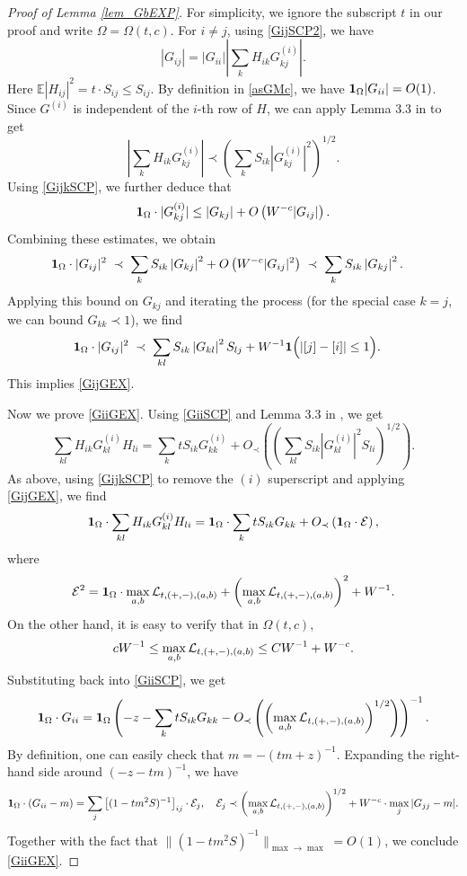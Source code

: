 \documentclass[10pt,reqno]{article}
\theoremstyle{plain} %
\theoremstyle{remark}
\numberwithin{equation}{section}
\begin{document}
\begin{proof}[Proof of Lemma \ref{lem_GbEXP}]
For simplicity, we ignore the subscript \( t \) in our proof and write \( \Omega = \Omega(t, c) \). For \( i \neq j \), using \eqref{GijSCP2}, we have
\[
|G_{ij}| = |G_{ii}| \left| \sum_{k} H_{ik} G^{(i)}_{kj} \right|.
\]
Here \( \mathbb{E} |H_{ij}|^2 = t \cdot S_{ij} \leq S_{ij} \). By definition in \eqref{asGMc}, we have $
{\bf 1}_{\Omega} |G_{ii}| = O(1)$. 
Since \( G^{(i)} \) is independent of the \( i \)-th row of \( H \), we can apply Lemma 3.3 in \cite{erdHos2012rigidity} to get
\[
\left| \sum_{k} H_{ik} G^{(i)}_{kj} \right| \prec 
\left( \sum_{k} S_{ik} \left| G^{(i)}_{kj} \right|^2 \right)^{1/2}.
\]
Using \eqref{GijkSCP}, we further deduce that
\[
{\bf 1}_{\Omega} \cdot |G^{(i)}_{kj}| \leq |G_{kj}| + O\left(W^{-c} |G_{ij}|\right).
\]
Combining these estimates, we obtain
\begin{align}
{\bf 1}_{\Omega} \cdot |G_{ij}|^2 & \;\prec\; \sum_{k} S_{ik} \left| G_{kj} \right|^2 + O\left(W^{-c} |G_{ij}|^2\right) 
 \;\prec\; \sum_{k} S_{ik} \left| G_{kj} \right|^2.
\end{align}
Applying this bound on \( G_{kj} \) and iterating the process (for the special case \( k = j \), we can bound \( G_{kk} \prec 1 \)), we find
\begin{align}
{\bf 1}_{\Omega} \cdot |G_{ij}|^2 & \;\prec\; \sum_{kl} S_{ik} \left| G_{kl} \right|^2 S_{lj} +
W^{-1} {\bf 1}\Big(|[j] - [i]| \leq 1\Big).
\end{align}
This implies \eqref{GijGEX}.

Now we prove \eqref{GiiGEX}. Using \eqref{GiiSCP} and Lemma 3.3 in \cite{erdHos2012rigidity}, we get
\[
 \sum_{kl} H_{ik} G^{(i)}_{kl} H_{li} =
\sum_{k} tS_{ik} G^{(i)}_{kk} +
O_\prec\left(\left(\sum_{kl} S_{ik} \left| G^{(i)}_{kl} \right|^2 S_{li}\right)^{1/2}\right).
\]
As above, using \eqref{GijkSCP} to remove the \( (i) \) superscript and applying \eqref{GijGEX}, we find
\[
{\bf 1}_{\Omega} \cdot \sum_{kl} H_{ik} G^{(i)}_{kl} H_{li} =
{\bf 1}_{\Omega} \cdot \sum_{k} t S_{ik} G_{kk} + O_\prec\left({\bf 1}_{\Omega} \cdot {\cal E}\right),
\]
where
\[
{\cal E}^2 = {\bf 1}_{\Omega} \cdot \max_{a,b} {\cal L}_{t,(+,-),(a,b)} +
\left(\max_{a,b} {\cal L}_{t,(+,-),(a,b)}\right)^2 + W^{-1}.
\]
On the other hand, it is easy to verify that in \( \Omega(t, c) \),
\[
c W^{-1} \leq \max_{a,b} {\cal L}_{t,(+,-),(a,b)} \leq C W^{-1} + W^{-c}.
\]
Substituting back into \eqref{GiiSCP}, we get
\[
{\bf 1}_{\Omega} \cdot G_{ii} =
{\bf 1}_{\Omega} \left(-z - \sum_{k} tS_{ik} G_{kk} - O_\prec\left(\left(\max_{a,b} {\cal L}_{t,(+,-),(a,b)}\right)^{1/2}\right) \right)^{-1}.
\]
By definition, one can easily check that \( m = -(tm + z)^{-1} \). Expanding the right-hand side around \( (-z - tm)^{-1} \), we have
\[
{\bf 1}_{\Omega} \cdot \left( G_{ii} - m \right) =
\sum_j \left[ (1 - t m^2  S)^{-1} \right]_{ij} \cdot {\cal E}_j, \quad {\cal E}_j \prec \left( \max_{a,b} {\cal L}_{t,(+,-),(a,b)} \right)^{1/2}+W^{-c}\cdot \max_j|G_{jj}-m|.
\]
Together with the fact that \( \|(1 - t m^2 S)^{-1}\|_{\max \to \max} = O(1) \), we conclude \eqref{GiiGEX}.


\end{proof}
\end{document}
